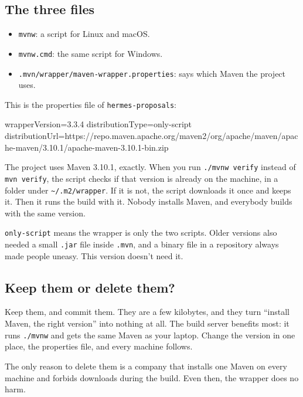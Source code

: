 \subsection*{The three files}

\begin{itemize}
  \item \texttt{mvnw}: a script for Linux and macOS.
  \item \texttt{mvnw.cmd}: the same script for Windows.
  \item \texttt{.mvn/wrapper/maven-wrapper.properties}: says which Maven the
        project uses.
\end{itemize}

This is the properties file of \texttt{hermes-proposals}:

\begin{code}[language={}]
wrapperVersion=3.3.4
distributionType=only-script
distributionUrl=https://repo.maven.apache.org/maven2/org/apache/maven/apache-maven/3.10.1/apache-maven-3.10.1-bin.zip
\end{code}

The project uses Maven 3.10.1, exactly. When you run \texttt{./mvnw verify}
instead of \texttt{mvn verify}, the script checks if that version is already
on the machine, in a folder under \texttt{\textasciitilde/.m2/wrapper}. If it
is not, the script downloads it once and keeps it. Then it runs the build
with it. Nobody installs Maven, and everybody builds with the same version.

\texttt{only-script} means the wrapper is only the two scripts. Older
versions also needed a small \texttt{.jar} file inside \texttt{.mvn}, and a
binary file in a repository always made people uneasy. This version doesn't
need it.

\subsection*{Keep them or delete them?}

Keep them, and commit them. They are a few kilobytes, and they turn ``install
Maven, the right version'' into nothing at all. The build server benefits
most: it runs \texttt{./mvnw} and gets the same Maven as your laptop. Change
the version in one place, the properties file, and every machine follows.

The only reason to delete them is a company that installs one Maven on every
machine and forbids downloads during the build. Even then, the wrapper does
no harm.

